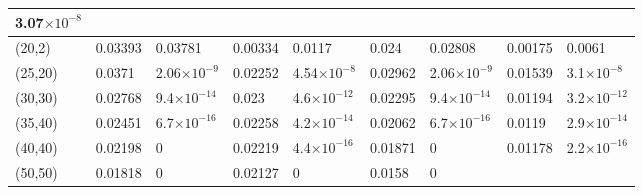 \documentclass[10pt,twosided]{article}
\numberwithin{equation}{section}
\numberwithin{equation}{section}
\begin{document}
\begin{table}
\begin{tabular}{|p{41pt}|p{32pt}|p{38pt}|p{32pt}|p{38pt}|p{32pt}|p{38pt}|p{32pt}|p{38pt}|}
{\small{3.07$\times10^{-8}$}
} \\
\hline
\parbox{41pt}{\raggedright
(20,2)
} & \parbox{32pt}{\raggedright
0.03393
} & \parbox{38pt}{\raggedright
0.03781
} & \parbox{32pt}{\raggedright
0.00334
} & \parbox{38pt}{\raggedright
0.0117
} & \parbox{32pt}{\raggedright
0.024
} & \parbox{38pt}{\raggedright
0.02808
} & \parbox{32pt}{\raggedright
0.00175
} & \parbox{38pt}{\raggedright
0.0061
} \\
\hline
\parbox{41pt}{\raggedright
(25,20)
} & \parbox{32pt}{\raggedright
0.0371
} & \parbox{38pt}{\raggedright
\small{2.06$\times10^{-9}$}
} & \parbox{32pt}{\raggedright
0.02252
} & \parbox{38pt}{\raggedright
\small{4.54$\times10^{-8}$}
} & \parbox{32pt}{\raggedright
0.02962
} & \parbox{38pt}{\raggedright
\small{2.06$\times10^{-9}$}
} & \parbox{32pt}{\raggedright
0.01539
} & \parbox{38pt}{\raggedright
\small{3.1$\times10^{-8}$}
} \\
\hline
\parbox{41pt}{\raggedright
(30,30)
} & \parbox{32pt}{\raggedright
0.02768
} & \parbox{38pt}{\raggedright
\small{9.4$\times10^{-14}$}
} & \parbox{32pt}{\raggedright
0.023
} & \parbox{38pt}{\raggedright
\small{4.6$\times10^{-12}$}
} & \parbox{32pt}{\raggedright
0.02295
} & \parbox{38pt}{\raggedright
\small{9.4$\times10^{-14}$}
} & \parbox{32pt}{\raggedright
0.01194
} & \parbox{38pt}{\raggedright
\small{3.2$\times10^{-12}$}
} \\
\hline
\parbox{41pt}{\raggedright
(35,40)
} & \parbox{32pt}{\raggedright
0.02451
} & \parbox{38pt}{\raggedright
\small{6.7$\times10^{-16}$}
} & \parbox{32pt}{\raggedright
0.02258
} & \parbox{38pt}{\raggedright
\small{4.2$\times10^{-14}$}
} & \parbox{32pt}{\raggedright
0.02062
} & \parbox{38pt}{\raggedright
\small{6.7$\times10^{-16}$}
} & \parbox{32pt}{\raggedright
0.0119
} & \parbox{38pt}{\raggedright
\small{2.9$\times10^{-14}$}
} \\
\hline
\parbox{41pt}{\raggedright
(40,40)
} & \parbox{32pt}{\raggedright
0.02198
} & \parbox{38pt}{\raggedright
0
} & \parbox{32pt}{\raggedright
0.02219
} & \parbox{38pt}{\raggedright
\small{4.4$\times10^{-16}$}
} & \parbox{32pt}{\raggedright
0.01871
} & \parbox{38pt}{\raggedright
0
} & \parbox{32pt}{\raggedright
0.01178
} & \parbox{38pt}{\raggedright
\small{2.2$\times10^{-16}$}
} \\
\hline
\parbox{41pt}{\raggedright
(50,50)
} & \parbox{32pt}{\raggedright
0.01818
} & \parbox{38pt}{\raggedright
0
} & \parbox{32pt}{\raggedright
0.02127
} & \parbox{38pt}{\raggedright
0
} & \parbox{32pt}{\raggedright
0.0158
} & \parbox{38pt}{\raggedright
0
} & \parbox{32pt}{\raggedright
}
\end{tabular}
\end{table}
\end{document}
